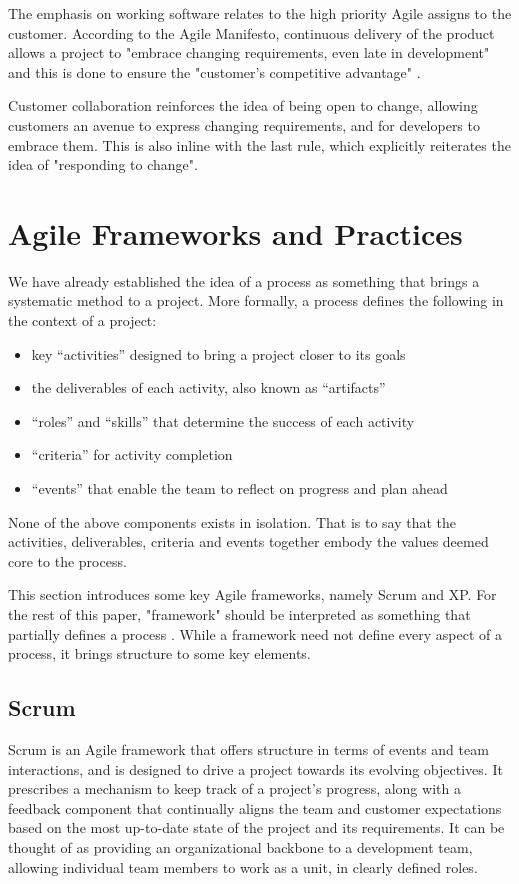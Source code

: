 \documentclass[11pt]{article}
\begin{document}
    The emphasis on working software relates to the high priority Agile assigns to the customer. According to the Agile Manifesto, continuous delivery of the product allows a project to "embrace changing requirements, even late in development" and this is done to ensure the "customer's competitive advantage" \citet{agilemanifesto}.

    Customer collaboration reinforces the idea of being open to change, allowing customers an avenue to express changing requirements, and for developers to embrace them. This is also inline with the last rule, which explicitly reiterates the idea of "responding to change".
    
\section{Agile Frameworks and Practices}
    We have already established the idea of a process as something that brings a systematic method to a project. More formally, a process defines the following in the context of a project:

    \begin{itemize}
        \item key “activities” designed to bring a project closer to its goals 
        \item the deliverables of each activity, also known as “artifacts” 
        \item “roles” and “skills” that determine the success of each activity
        \item “criteria” for activity completion
        \item “events” that enable the team to reflect on progress and plan ahead
    \end{itemize} 
    \citet{sethi}
    
    None of the above components exists in isolation. That is to say that the activities, deliverables, criteria and events together embody the values deemed core to the process.

    This section introduces some key Agile frameworks, namely Scrum and XP. For the rest of this paper, "framework" should be interpreted as something that partially defines a process \citet{sethi}. While a framework need not define every aspect of a process, it brings structure to some key elements.

    
    \subsection{Scrum}
        Scrum is an Agile framework that offers structure in terms of events and team interactions, and is designed to drive a project towards its evolving objectives. It prescribes a mechanism to keep track of a project's progress, along with a feedback component that continually aligns the team and customer expectations based on the most up-to-date state of the project and its requirements. It can be thought of as providing an organizational backbone to a development team, allowing individual team members to work as a unit, in clearly defined roles.
\end{document}
